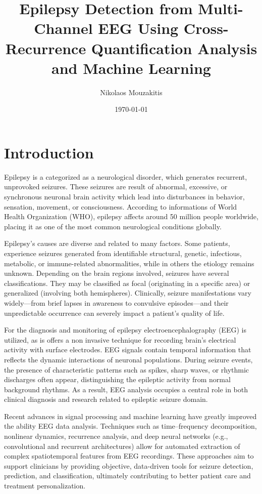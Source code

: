 \documentclass{article}
\title{Epilepsy Detection from Multi-Channel EEG Using Cross-Recurrence Quantification Analysis and Machine Learning}
\author{Nikolaos Mouzakitis} %
\date{\today} %
\begin{document}
	\maketitle

	\section*{Introduction}

	Epilepsy is a categorized as a neurological disorder, 
	which generates recurrent, unprovoked seizures. 
	These seizures are result of abnormal, excessive, or synchronous neuronal brain activity which lead into 
	disturbances in behavior, sensation, movement, or consciousness. 
	According to informations of World Health Organization (WHO), epilepsy affects 
	around 50 million people worldwide, placing it as one of the most common neurological conditions globally.

	Epilepsy's causes are diverse and related to many factors. Some patients, experience seizures generated from identifiable structural, 
	genetic, infectious, metabolic, or immune-related abnormalities, while in others the etiology remains unknown. 
	Depending on the brain regions involved, seizures have several classifications. They may be classified as focal 
	(originating in a specific area) or generalized (involving both hemispheres). 
	Clinically, seizure manifestations vary widely—from brief lapses in awareness to 
	convulsive episodes—and their unpredictable occurrence can severely impact a patient’s quality of life.

	For the diagnosis and monitoring of epilepsy electroencephalography (EEG) is utilized, as is offers a non invasive 
	technique for recording brain’s electrical activity with surface electrodes. 
	EEG signals contain temporal information that reflects the dynamic interactions 
	of neuronal populations. 
	During seizure events, the presence of characteristic patterns such as spikes, sharp waves, or rhythmic discharges often appear, 
	distinguishing the epileptic activity from normal background rhythms. 
	As a result, EEG analysis occupies a central role in both clinical diagnosis and research related to epileptic seizure domain.

	Recent advances in signal processing and machine learning have greatly 
	improved the ability EEG data analysis. 
	Techniques such as time–frequency decomposition, nonlinear dynamics, recurrence analysis, and deep neural networks (e.g., convolutional and recurrent architectures) allow for automated extraction of complex spatiotemporal features from EEG recordings. These approaches aim to support clinicians by providing objective, data-driven tools for seizure detection, prediction, and classification, ultimately contributing to better patient care and treatment personalization.
\end{document}
